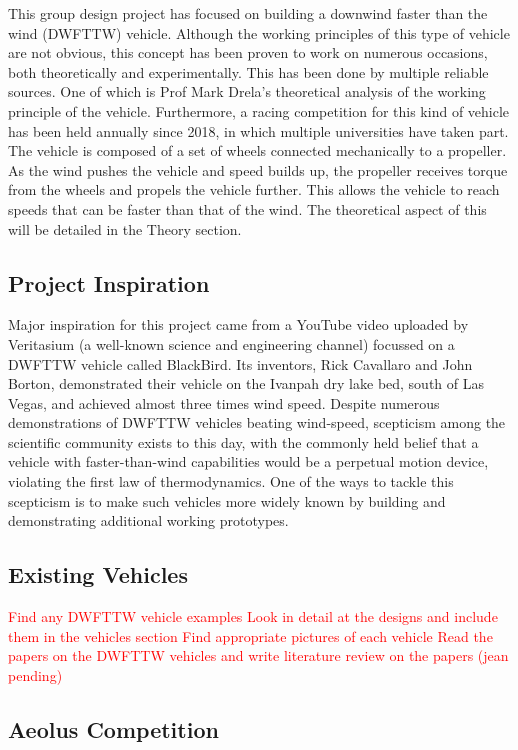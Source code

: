 This group design project has focused on building a downwind faster than the wind (DWFTTW) vehicle. Although the working principles of this type of vehicle are not obvious, this concept has been proven to work on numerous occasions, both theoretically and experimentally. This has been done by multiple reliable sources. One of which is Prof Mark Drela's theoretical analysis of the working principle of the vehicle. Furthermore, a racing competition for this kind of vehicle has been held annually since 2018, in which multiple universities have taken part. The vehicle is composed of a set of wheels connected mechanically to a propeller. As the wind pushes the vehicle and speed builds up, the propeller receives torque from the wheels and propels the vehicle further. This allows the vehicle to reach speeds that can be faster than that of the wind. The theoretical aspect of this will be detailed in the Theory section.

\subsection{Project Inspiration}

Major inspiration for this project came from a YouTube video uploaded by Veritasium (a well-known science and engineering channel) focussed on a DWFTTW vehicle called BlackBird. Its inventors, Rick Cavallaro and John Borton, demonstrated their vehicle on the Ivanpah dry lake bed, south of Las Vegas, and achieved almost three times wind speed. Despite numerous demonstrations of DWFTTW vehicles beating wind-speed, scepticism among the scientific community exists to this day, with the commonly held belief that a vehicle with faster-than-wind capabilities would be a perpetual motion device, violating the first law of thermodynamics. One of the ways to tackle this scepticism is to make such vehicles more widely known by building and demonstrating additional working prototypes.

\subsection{Existing Vehicles}

\textcolor{red}{
    Find any DWFTTW vehicle examples
    Look in detail at the designs and include them in the vehicles section
    Find appropriate pictures of each vehicle
    Read the papers on the DWFTTW vehicles and write literature review on the papers (jean pending)
}

\subsection{Aeolus Competition}

